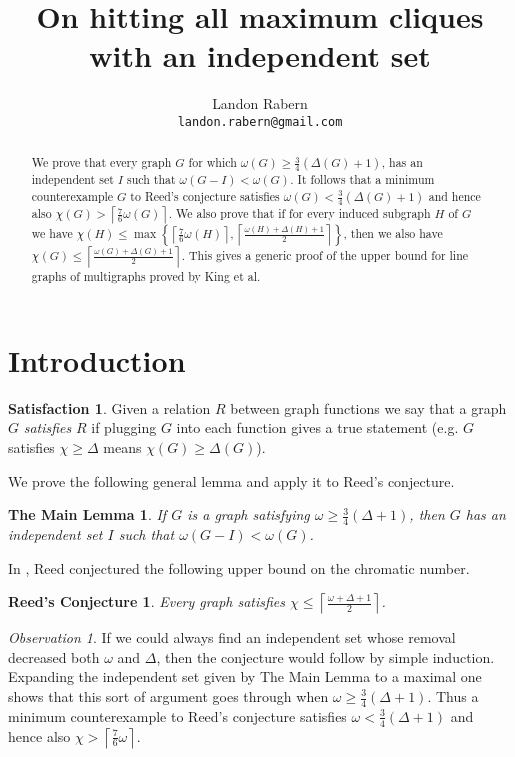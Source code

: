\documentclass[12pt]{article}
\title{On hitting all maximum cliques with an independent set}
\author{Landon Rabern\\
\small \texttt{landon.rabern@gmail.com}}
\theoremstyle{plain}
\newtheorem*{MainLemma}{The Main Lemma}
\newtheorem*{ReedConjecture}{Reed's Conjecture}
\theoremstyle{definition}
\newtheorem*{Satisfaction}{Satisfaction}
\theoremstyle{remark}
\newtheorem*{observation}{Observation}
\begin{document}
\maketitle

\begin{abstract}
We prove that every graph $G$ for which $\omega(G) \geq \frac{3}{4}(\Delta(G) + 1)$, has an independent set $I$ such that $\omega(G - I) < \omega(G)$.  It follows that a minimum counterexample $G$ to Reed's conjecture satisfies $\omega(G) < \frac{3}{4}(\Delta(G) + 1)$ and hence also $\chi(G) > \left\lceil \frac{7}{6}\omega(G) \right\rceil$.  We also prove that if for every induced subgraph $H$ of $G$ we have $\chi(H) \leq \max\left\{\left\lceil \frac{7}{6}\omega(H) \right\rceil, \left\lceil \frac{\omega(H) + \Delta(H) + 1}{2}\right\rceil\right\}$, then we also have $\chi(G) \leq \left\lceil \frac{\omega(G) + \Delta(G) + 1}{2}\right\rceil$.  This gives a generic proof of the upper bound for line graphs of multigraphs proved by King et al.  
\end{abstract}

\section{Introduction}
\begin{Satisfaction}
Given a relation $R$ between graph functions we say that a graph $G$ \emph{satisfies} $R$ if plugging $G$ into each function gives a true statement (e.g. $G$ satisfies $\chi \geq \Delta$ means $\chi(G) \geq \Delta(G)$).
\end{Satisfaction}

We prove the following general lemma and apply it to Reed's conjecture.

\begin{MainLemma}
If $G$ is a graph satisfying $\omega \geq \frac{3}{4}(\Delta + 1)$, then $G$ has an independent set $I$ such that $\omega(G - I) < \omega(G)$.
\end{MainLemma}

In \cite{Reed}, Reed conjectured the following upper bound on the chromatic number.

\begin{ReedConjecture}
Every graph satisfies $\chi \leq \left\lceil \frac{\omega + \Delta + 1}{2}\right\rceil$.
\end{ReedConjecture}

\begin{observation}
If we could always find an independent set whose removal decreased both $\omega$ and $\Delta$, then the conjecture would follow by simple induction.  Expanding the independent set given by The Main Lemma to a maximal one shows that this sort of argument goes through when $\omega \geq \frac{3}{4}(\Delta + 1)$.
Thus a minimum counterexample to Reed's conjecture satisfies $\omega < \frac{3}{4}(\Delta + 1)$ and hence also $\chi > \left\lceil \frac{7}{6}\omega \right\rceil$.\\
\end{observation}
\end{document}
